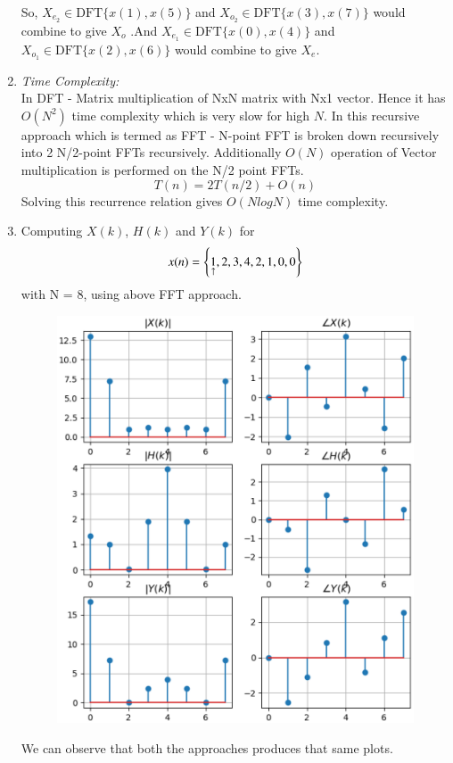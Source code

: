 \documentclass[journal,12pt,twocolumn]{IEEEtran}
\renewcommand\thesection{\arabic{section}}
\begin{document}
\begin{enumerate}[label=\thesection.\arabic*.,ref=\thesection.\theenumi]
So, $X_{e_{2}} \in \text{DFT} \{x(1),x(5)\}$ and $X_{o_{2}} \in \text{DFT} \{x(3),x(7)\}$ would combine to give $X_{o}$ .And $X_{e_{1}} \in \text{DFT} \{x(0),x(4)\}$ and $X_{o_{1}} \in \text{DFT} \{x(2),x(6)\}$ would combine to give $X_{e}$.



\item \emph{Time Complexity:} \\
In DFT - Matrix multiplication of NxN matrix with Nx1 vector.
Hence it has $O(N^2)$ time complexity which is very slow for high $N$.
\newline
In this recursive approach which is termed as FFT - N-point FFT is broken down recursively into 2 N/2-point FFTs recursively.
Additionally $O(N)$ operation of Vector multiplication is performed on the N/2 point FFTs.
\begin{equation}
    T(n) = 2T(n/2) + O(n)
\end{equation}
Solving this recurrence relation gives $O(NlogN)$ time complexity.

\item Computing $X(k)$, $H(k)$ and $Y(k)$ for 
    \begin{align}
        x(n) = \left\{\underset{\uparrow}{1},2,3,4,2,1,0,0\right\}
    \end{align}
with N = 8, using above FFT approach.

\begin{figure}[!ht]
	\includegraphics[width=1.15\columnwidth]{./figs/ee18btech11017_fig3.eps}
\end{figure}
We can observe that both the approaches produces that same plots.


\end{enumerate}
\end{document}
